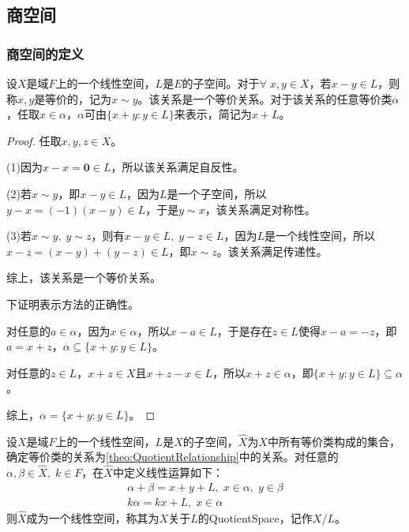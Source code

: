 \subsection{商空间}
\subsubsection{商空间的定义}
\begin{theorem}\label{theo:QuotientRelationship}
	设$X$是域$F$上的一个线性空间，$L$是$E$的子空间。对于$\forall\;x,y\in X$，若$x-y\in L$，则称$x,y$是等价的，记为$x\sim y$。该关系是一个等价关系。对于该关系的任意等价类$\alpha$，任取$x\in\alpha$，$\alpha$可由$\{x+y:y\in L\}$来表示，简记为$x+L$。
\end{theorem}
\begin{proof}
	任取$x,y,z\in X$。\par
	(1)因为$x-x=\mathbf{0}\in L$，所以该关系满足自反性。\par
	(2)若$x\sim y$，即$x-y\in L$，因为$L$是一个子空间，所以$y-x=(-1)(x-y)\in L$，于是$y\sim x$，该关系满足对称性。\par
	(3)若$x\sim y,\;y\sim z$，则有$x-y\in L,\;y-z\in L$，因为$L$是一个线性空间，所以$x-z=(x-y)+(y-z)\in L$，即$x\sim z$。该关系满足传递性。\par
	综上，该关系是一个等价关系。\par
	下证明表示方法的正确性。\par
	对任意的$a\in\alpha$，因为$x\in\alpha$，所以$x-a\in L$，于是存在$z\in L$使得$x-a=-z$，即$a=x+z$，$\alpha\subseteq\{x+y:y\in L\}$。\par
	对任意的$z\in L$，$x+z\in X$且$x+z-x\in L$，所以$x+z\in\alpha$，即$\{x+y:y\in L\}\subseteq\alpha$。\par
	综上，$\alpha=\{x+y:y\in L\}$。
\end{proof}
\begin{definition}
	设$X$是域$F$上的一个线性空间，$L$是$X$的子空间，$\hat{X}$为$X$中所有等价类构成的集合，确定等价类的关系为\cref{theo:QuotientRelationship}中的关系。对任意的$\alpha,\beta\in\hat{X},\;k\in F$，在$\hat{X}$中定义线性运算如下：
	\begin{gather*}
		\alpha+\beta=x+y+L,\;x\in\alpha,\;y\in\beta \\
		k\alpha=kx+L,\;x\in\alpha
	\end{gather*}
	则$\hat{X}$成为一个线性空间，称其为$X$关于$L$的\gls{QuotientSpace}，记作$X/L$。
\end{definition}

